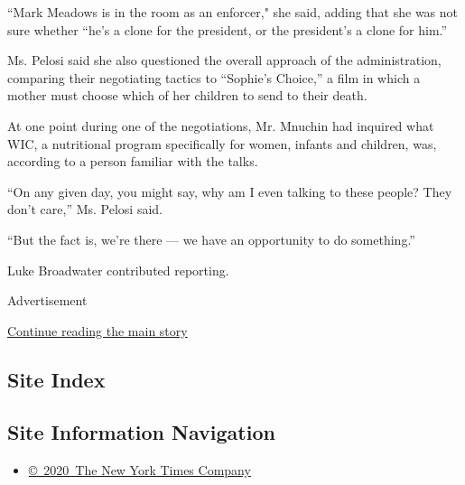 ``Mark Meadows is in the room as an enforcer," she said, adding that she
was not sure whether ``he's a clone for the president, or the
president's a clone for him.''

Ms. Pelosi said she also questioned the overall approach of the
administration, comparing their negotiating tactics to ``Sophie's
Choice,'' a film in which a mother must choose which of her children to
send to their death.

At one point during one of the negotiations, Mr. Mnuchin had inquired
what WIC, a nutritional program specifically for women, infants and
children, was, according to a person familiar with the talks.

``On any given day, you might say, why am I even talking to these
people? They don't care,'' Ms. Pelosi said.

``But the fact is, we're there --- we have an opportunity to do
something.''

Luke Broadwater contributed reporting.

Advertisement

\protect\hyperlink{after-bottom}{Continue reading the main story}

\hypertarget{site-index}{%
\subsection{Site Index}\label{site-index}}

\hypertarget{site-information-navigation}{%
\subsection{Site Information
Navigation}\label{site-information-navigation}}

\begin{itemize}
\tightlist
\item
  \href{https://help.nytimes.com/hc/en-us/articles/115014792127-Copyright-notice}{©~2020~The
  New York Times Company}
\end{itemize}

